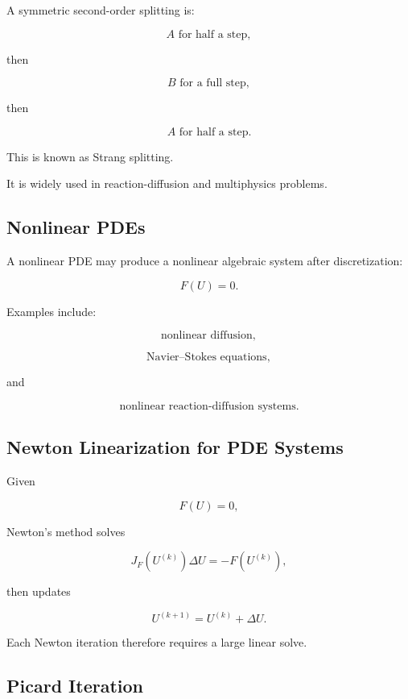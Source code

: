 A symmetric second-order splitting is:

\[
\boxed{
A
\text{ for half a step},
}
\]

then

\[
\boxed{
B
\text{ for a full step},
}
\]

then

\[
\boxed{
A
\text{ for half a step}.
}
\]

This is known as Strang splitting.

It is widely used in reaction-diffusion and multiphysics problems.

\subsection{Nonlinear PDEs}
\label{subsec:numerical-nonlinear-pdes}

A nonlinear PDE may produce a nonlinear algebraic system after
discretization:

\[
\boxed{
F(U)=0.
}
\]

Examples include:

\[
\boxed{
\text{nonlinear diffusion},
}
\]

\[
\boxed{
\text{Navier--Stokes equations},
}
\]

and

\[
\boxed{
\text{nonlinear reaction-diffusion systems}.
}
\]

\subsection{Newton Linearization for PDE Systems}
\label{subsec:newton-linearization-pde}

Given

\[
F(U)=0,
\]

Newton's method solves

\[
\boxed{
J_F(U^{(k)})
\Delta U
=
-
F(U^{(k)}),
}
\]

then updates

\[
\boxed{
U^{(k+1)}
=
U^{(k)}
+
\Delta U.
}
\]

Each Newton iteration therefore requires a large linear solve.

\subsection{Picard Iteration}
\label{subsec:picard-pde}

